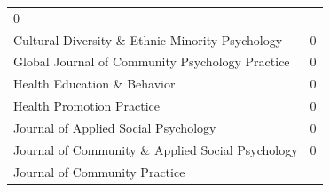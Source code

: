 \documentclass[]{tufte-handout}
\begin{document}
\begin{longtable}[]{@{}ll@{}}
\begin{minipage}[t]{0.21\columnwidth}
0\strut
\end{minipage}\tabularnewline
\begin{minipage}[t]{0.68\columnwidth}\raggedright\strut
Cultural Diversity \& Ethnic Minority Psychology\strut
\end{minipage} & \begin{minipage}[t]{0.21\columnwidth}\raggedright\strut
0\strut
\end{minipage}\tabularnewline
\begin{minipage}[t]{0.68\columnwidth}\raggedright\strut
Global Journal of Community Psychology Practice\strut
\end{minipage} & \begin{minipage}[t]{0.21\columnwidth}\raggedright\strut
0\strut
\end{minipage}\tabularnewline
\begin{minipage}[t]{0.68\columnwidth}\raggedright\strut
Health Education \& Behavior\strut
\end{minipage} & \begin{minipage}[t]{0.21\columnwidth}\raggedright\strut
0\strut
\end{minipage}\tabularnewline
\begin{minipage}[t]{0.68\columnwidth}\raggedright\strut
Health Promotion Practice\strut
\end{minipage} & \begin{minipage}[t]{0.21\columnwidth}\raggedright\strut
0\strut
\end{minipage}\tabularnewline
\begin{minipage}[t]{0.68\columnwidth}\raggedright\strut
Journal of Applied Social Psychology\strut
\end{minipage} & \begin{minipage}[t]{0.21\columnwidth}\raggedright\strut
0\strut
\end{minipage}\tabularnewline
\begin{minipage}[t]{0.68\columnwidth}\raggedright\strut
Journal of Community \& Applied Social Psychology\strut
\end{minipage} & \begin{minipage}[t]{0.21\columnwidth}\raggedright\strut
0\strut
\end{minipage}\tabularnewline
\begin{minipage}[t]{0.68\columnwidth}\raggedright\strut
Journal of Community Practice\strut
\end{minipage} & \begin{minipage}[t]{0.21\columnwidth}\raggedright\strut

\end{minipage}
\end{longtable}
\end{document}
